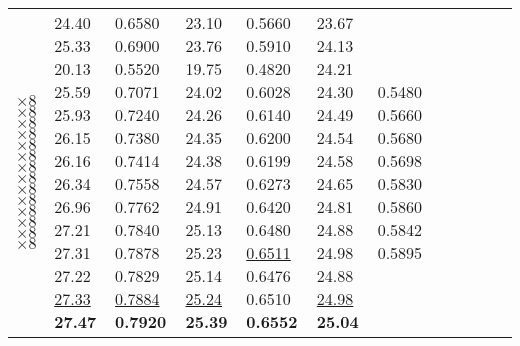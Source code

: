 \documentclass[runningheads]{llncs}
\begin{document}
\begin{table}[!ht]
\begin{tabular}{|p{7em}|p{2.5em}|p{2.5em}|p{3em}|p{2.5em}|p{3em}|p{2.5em}|p{3em}|p{2.5em}|p{3em}|p{2.5em}|p{3em}|}
		$\times8$ \newline{}$\times8$ \newline{}$\times8$ \newline{}$\times8$ \newline{}$\times8$ \newline{}$\times8$ \newline{}$\times8$ \newline{}$\times8$ \newline{}$\times8$ \newline{}$\times8$ \newline{}$\times8$ \newline{}$\times8$ \newline{}$\times8$ \newline{}$\times8$  & 24.40 \newline{}25.33 \newline{}20.13 \newline{}25.59 \newline{}25.93 \newline{}26.15 \newline{}26.16 \newline{}26.34 \newline{}26.96 \newline{}27.21 \newline{}27.31 \newline{}27.22 \newline{}\underline{27.33} \newline{}\bfseries{27.47}& 0.6580 \newline{}0.6900 \newline{}0.5520 \newline{}0.7071 \newline{}0.7240 \newline{}0.7380 \newline{}0.7414 \newline{}0.7558 \newline{}0.7762 \newline{}0.7840 \newline{}0.7878 \newline{}0.7829 \newline{}\underline{0.7884} \newline{}\bfseries{0.7920} & 23.10 \newline{}23.76 \newline{}19.75 \newline{}24.02 \newline{}24.26 \newline{}24.35 \newline{}24.38 \newline{}24.57 \newline{}24.91 \newline{}25.13 \newline{}25.23 \newline{}25.14 \newline{}\underline{25.24} \newline{}\bfseries{25.39} & 0.5660 \newline{}0.5910 \newline{}0.4820 \newline{}0.6028 \newline{}0.6140 \newline{}0.6200 \newline{}0.6199 \newline{}0.6273 \newline{}0.6420 \newline{}0.6480 \newline{}\underline{0.6511} \newline{}0.6476 \newline{}0.6510 \newline{}\bfseries{0.6552} & 23.67 \newline{}24.13 \newline{}24.21 \newline{}24.30 \newline{}24.49 \newline{}24.54 \newline{}24.58 \newline{}24.65 \newline{}24.81 \newline{}24.88 \newline{}24.98 \newline{}24.88 \newline{}\underline{24.98} \newline{}\bfseries{25.04} & 0.5480 \newline{}0.5660 \newline{}0.5680 \newline{}0.5698 \newline{}0.5830 \newline{}0.5860 \newline{}0.5842 \newline{}0.5895 \newline{}
\end{tabular}
\end{table}
\end{document}
